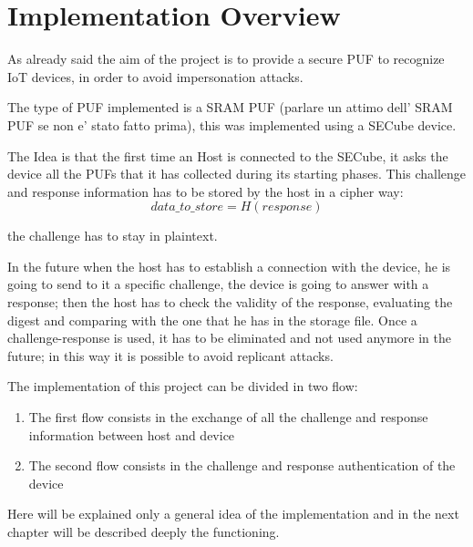 \chapter{Implementation Overview}
As already said the aim of the project is to provide a secure PUF to recognize IoT devices, in order to avoid impersonation attacks.

The type of PUF implemented is a SRAM PUF (parlare un attimo dell' SRAM PUF se non e' stato fatto prima), this was implemented using a SECube device.

The Idea is that the first time an Host is connected to the SECube, it asks the device all the PUFs that it has collected during its starting phases.
This challenge and response information has to be stored by the host in a cipher way:
\begin{equation}\label{eq:eq1}
 data\_to\_store=H(response)
 \end{equation}
 
  the challenge has to stay in plaintext.

In the future when the host has to establish a connection with the device, he is going to send to it a specific challenge, the device is going to answer with a response;
then the host has to check the validity of the response, evaluating the digest and comparing with the one that he has in the storage file.
Once a challenge-response is used, it has to be eliminated and not used anymore in the future; in this way it is possible to avoid replicant attacks.


The implementation of this project can be divided in two flow:
\begin{enumerate}
	\item The first flow consists in the exchange of all the challenge and response information between host and device 
	\item The second flow consists in the challenge and response authentication of the device
\end{enumerate}

Here will be explained only a general idea of the implementation and in the next chapter will be described deeply the functioning.

